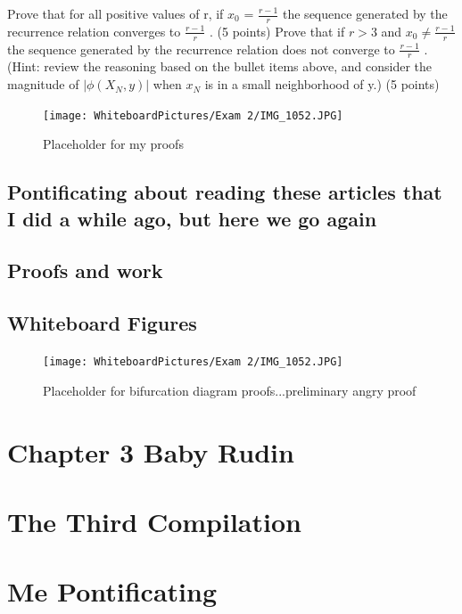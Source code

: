 Prove that for all positive values of r, if $x_0$ =
$\frac{r-1}{r}$
 the sequence generated by the recurrence relation
converges to $\frac{r-1}{r}$
. (5 points)
Prove that if $r>3$ and $x_0 \neq \frac{r-1}{r}$the sequence generated by the recurrence relation does not
converge to $\frac{r-1}{r}$
. (Hint: review the reasoning based on the bullet items above, and consider the
magnitude of $|\phi (X_N,y)|$ when  $x_N$  is in a small neighborhood of   y.) (5 points)
\begin{figure}[h]\begin{center}\texttt{[image: WhiteboardPictures/Exam 2/IMG\_1052.JPG]}
\caption{Placeholder for my proofs} \label{fig:Euler_pic}\end{center}\end{figure} 

\subsection{Pontificating about reading these articles that I did a while ago, but here we go again}


\subsection{Proofs and work}


\subsection{Whiteboard Figures}
\begin{figure}[ht]\begin{center}\texttt{[image: WhiteboardPictures/Exam 2/IMG\_1052.JPG]}
\caption{Placeholder for bifurcation diagram proofs...preliminary angry proof} \label{fig:Euler_pic}\end{center}\end{figure} 



\newpage 
\section{Chapter 3 Baby Rudin}


\section{The Third Compilation}
\section*{Me Pontificating}

